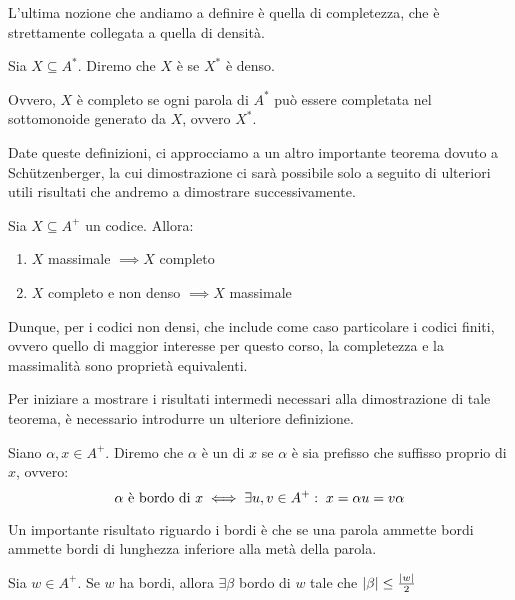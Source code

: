 L'ultima nozione che andiamo a definire è quella di completezza, che è strettamente collegata a quella di densità.
\begin{definition}
  Sia \(X \subseteq A^*\). Diremo che \(X\) è  se \(X^*\) è denso.

  Ovvero, \(X\) è completo se ogni parola di \(A^*\) può essere completata nel sottomonoide generato da \(X\), ovvero \(X^*\).
\end{definition}

Date queste definizioni, ci approcciamo a un altro importante teorema dovuto a Schützenberger, la cui dimostrazione ci sarà possibile solo a seguito di ulteriori utili risultati che andremo a dimostrare successivamente.

\begin{theorem}\label{thm:schutz_maximality_completeness}
  Sia \(X \subseteq A^+\) un codice.
  Allora:
  \begin{enumerate}
    \item \(X\) massimale \(\implies X\) completo
    \item \(X\) completo e non denso \(\implies X\) massimale
  \end{enumerate}
\end{theorem}

Dunque, per i codici non densi, che include come caso particolare i codici finiti, ovvero quello di maggior interesse per questo corso, la completezza e la massimalità sono proprietà equivalenti.

Per iniziare a mostrare i risultati intermedi necessari alla dimostrazione di tale teorema, è necessario introdurre un ulteriore definizione.
\begin{definition}
  Siano \(\alpha,x \in A^+\). Diremo che \(\alpha\) è un  di \(x\) se \(\alpha\) è sia prefisso che suffisso proprio di \(x\), ovvero:
  \[\alpha \text{ è bordo di } x \iff \exists u,v \in A^+ :\; x = \alpha u = v \alpha\]
\end{definition}

Un importante risultato riguardo i bordi è che se una parola ammette bordi ammette bordi di lunghezza inferiore alla metà della parola.

\begin{proposition}\label{prop:if_border_exists_border_half_length}
  Sia \(w \in A^+\). Se \(w\) ha bordi, allora \(\exists \beta\) bordo di \(w\) tale che \(\left|\beta\right|\leq\frac{\left|w\right|}{2}\)
\end{proposition}

